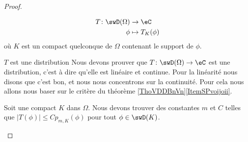 \begin{proof}
\begin{subproof}
        \begin{equation}
            \begin{aligned}
                T\colon \swD(\Omega)&\to \eC \\
                \phi&\mapsto T_K(\phi) 
            \end{aligned}
        \end{equation}
        où \( K\) est un compact quelconque de \( \Omega\) contenant le support de \( \phi\).
    \item[$ T$ est une distribution]
        Nous devons prouver que \( T\colon\swD(\Omega) \to \eC\) est une distribution, c'est à dire qu'elle est linéaire et continue. Pour la linéarité nous disons que c'est bon, et nous nous concentrons sur la continuité. Pour cela nous allons nous baser sur le critère du théorème \ref{ThoVDDBnVn}\ref{ItemSPvoijoii}.

        Soit une compact \( K\) dans \( \Omega\). Nous devons trouver des constantes \( m\) et \( C\) telles que \( |T(\phi)|\leq Cp_{m,K}(\phi)\) pour tout \( \phi\in \swD(K)\).


\end{subproof}
\end{proof}

